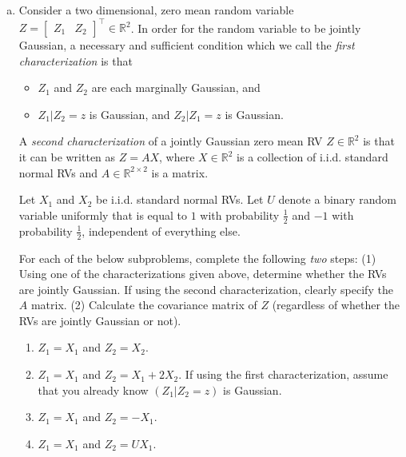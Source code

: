 \documentclass{article}
\begin{document}
\begin{enumerate}[(a)]
    \item Consider a two dimensional, zero mean random variable $Z = \begin{bmatrix} Z_1 & Z_2 \end{bmatrix}^\top \in \mathbb{R}^2$. 
    In order for the random variable to be jointly Gaussian, a necessary and sufficient condition which we call the \textit{first characterization} is that 
    \begin{itemize}
        \item $Z_1$ and $Z_2$ are each marginally Gaussian, and
        \item $Z_1 | Z_2 = z$ is Gaussian, and $Z_2 | Z_1 = z$ is Gaussian.
    \end{itemize}

    A \textit{second characterization} of a jointly Gaussian zero mean RV $Z \in \mathbb{R}^2$ is that it can be written as $Z = A X$, where $X \in \mathbb{R}^2$ is a collection of i.i.d. standard normal RVs and $A \in \mathbb{R}^{2 \times 2}$ is a matrix.

    Let $X_1$ and $X_2$ be i.i.d. standard normal RVs. Let $U$ denote a binary random variable uniformly that is equal to $1$ with probability $\frac{1}{2}$ and $-1$ with probability $\frac{1}{2}$, independent of everything else. 

    For each of the below subproblems, complete the following \emph{two} steps:
    (1) Using one of the characterizations given above, determine whether the RVs are jointly Gaussian. If using the second characterization, clearly specify the $A$ matrix. 
    (2) Calculate the covariance matrix of $Z$ (regardless of whether the RVs are jointly Gaussian or not).

    \begin{enumerate}[(i.)]
        \item $Z_1 = X_1$ and $Z_2 = X_2$.
        \item $Z_1 = X_1$ and $Z_2 = X_1 + 2X_2$. If using the first characterization, assume that you already know $(Z_1 | Z_2 = z)$ is Gaussian. %
        \item $Z_1 = X_1$ and $Z_2 = -X_1$.
        \item $Z_1 = X_1$ and $Z_2 = U X_1$.
    \end{enumerate}


\end{enumerate}
\end{document}
